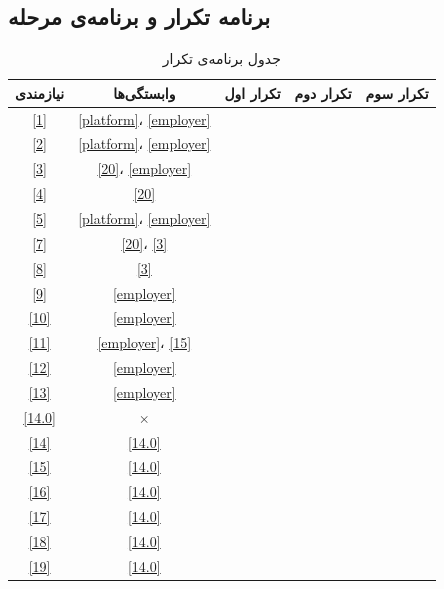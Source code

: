\documentclass[12pt, svgnames, oneside]{book}
\begin{document}
			\subsection{برنامه تکرار و برنامه‌ی مرحله}
				\begin{center}
					\begin{longtable}{|c|c|c|c|c|}
						\caption{جدول برنامه‌ی تکرار}
						\endfirsthead
						\endhead
						\hline
						نیازمندی & وابستگی‌ها & تکرار اول & تکرار دوم & تکرار سوم \\
						\hline
						\hline
						\ref{1} & \ref{platform}، \ref{employer} & & & \\ \hline
						\ref{2} & \ref{platform}، \ref{employer} & \checkmark & & \\ \hline
						\ref{3} & \ref{20}، \ref{employer} & \checkmark & & \\ \hline
						\ref{4} & \ref{20} & \checkmark & & \\ \hline
						\ref{5} & \ref{platform}، \ref{employer} & \checkmark & & \\ \hline
						\ref{7} & \ref{20}، \ref{3} & & & \\ \hline
						\ref{8} & \ref{3} & \checkmark & & \\ \hline
						\ref{9} & \ref{employer} & \checkmark & & \\ \hline
						\ref{10} & \ref{employer} & \checkmark & & \\ \hline
						\ref{11} & \ref{employer}، \ref{15} & \checkmark & & \\ \hline
						\ref{12} & \ref{employer} & & & \\ \hline
						\ref{13} & \ref{employer} & \checkmark & & \\ \hline
						
						\ref{14.0} & $\times$ & \checkmark & & \\ \hline
						\ref{14} & \ref{14.0} & \checkmark & & \\ \hline
						\ref{15} & \ref{14.0} & \checkmark & & \\ \hline
						\ref{16} & \ref{14.0} & \checkmark & & \\ \hline
						\ref{17} & \ref{14.0} & \checkmark & & \\ \hline
						\ref{18} & \ref{14.0} & \checkmark & & \\ \hline
						\ref{19} & \ref{14.0} & \checkmark & & \\ \hline
						

\end{longtable}
\end{center}
\end{document}
